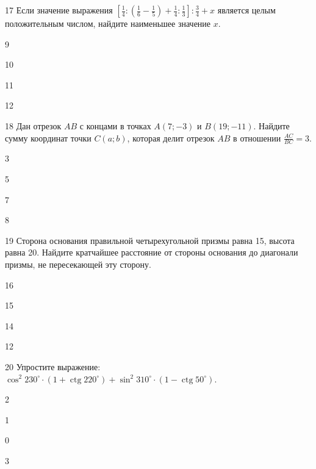 \documentclass[14pt]{article}
\begin{document}
\begin{questionbox}{17}
    Если значение выражения \(\left[\frac{1}{4} : \left(\frac{1}{6} - \frac{1}{5}\right) + \frac{1}{4} : \frac{1}{3}\right] : \frac{3}{4} + x\) является целым положительным числом, найдите наименьшее значение \(x\).
    \begin{options}
        \item 9
        \item 10
        \item 11
        \item 12
    \end{options}
\end{questionbox}



\begin{questionbox}{18}
    Дан отрезок \(AB\) с концами в точках \(A(7; -3)\) и \(B(19; -11)\). Найдите сумму координат точки \(C(a; b)\), которая делит отрезок \(AB\) в отношении \(\frac{AC}{BC} = 3\).
    \begin{options}
        \item 3
        \item 5
        \item 7
        \item 8
    \end{options}
\end{questionbox}



\begin{questionbox}{19}
    Сторона основания правильной четырехугольной призмы равна 15, высота равна 20. Найдите кратчайшее расстояние от стороны основания до диагонали призмы, не пересекающей эту сторону.
    \begin{options}
        \item 16
        \item 15
        \item 14
        \item 12
    \end{options}
\end{questionbox}



\begin{questionbox}{20}
    Упростите выражение: \(\cos^2 230^\circ \cdot (1 + \operatorname{ctg}220^\circ) + \sin^2 310^\circ \cdot (1 - \operatorname{ctg} 50^\circ)\).
    \begin{options}
        \item 2
        \item 1
        \item 0
        \item 3
    \end{options}
\end{questionbox}
\end{document}
